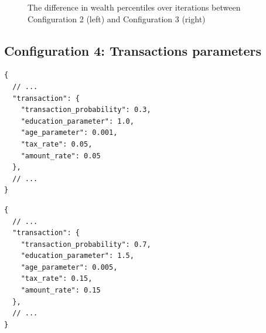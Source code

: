 \documentclass[english]{projectreport}
\begin{document}
\begin{figure}[H]
\begin{center}
%
\end{center}
\caption{The difference in wealth percentiles over iterations between Configuration 2 (left) and Configuration 3 (right)}
\end{figure}

\subsection{Configuration 4: Transactions parameters}

\begin{minipage}{0.48\textwidth}
\begin{verbatim}
{
  // ...
  "transaction": {
    "transaction_probability": 0.3,
    "education_parameter": 1.0,
    "age_parameter": 0.001,
    "tax_rate": 0.05,
    "amount_rate": 0.05
  },
  // ...
}
\end{verbatim}
\end{minipage}
\hfill
\begin{minipage}{0.48\textwidth}
\begin{verbatim}
{
  // ...
  "transaction": {
    "transaction_probability": 0.7,
    "education_parameter": 1.5,
    "age_parameter": 0.005,
    "tax_rate": 0.15,
    "amount_rate": 0.15
  },
  // ...
}
\end{verbatim}
\end{minipage}
\end{document}

